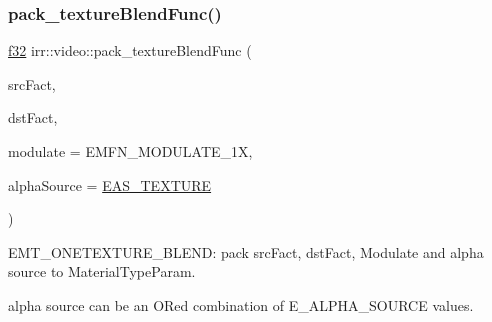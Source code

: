 \subsubsection{\texorpdfstring{pack\+\_\+texture\+Blend\+Func()}{pack\_textureBlendFunc()}}
{\footnotesize\ttfamily \hyperlink{namespaceirr_a0277be98d67dc26ff93b1a6a1d086b07}{f32} irr\+::video\+::pack\+\_\+texture\+Blend\+Func (\begin{DoxyParamCaption}\item[{const \hyperlink{namespaceirr_1_1video_acae10401850a6cfd5fcf1548c6c884bc}{E\+\_\+\+B\+L\+E\+N\+D\+\_\+\+F\+A\+C\+T\+OR}}]{src\+Fact,  }\item[{const \hyperlink{namespaceirr_1_1video_acae10401850a6cfd5fcf1548c6c884bc}{E\+\_\+\+B\+L\+E\+N\+D\+\_\+\+F\+A\+C\+T\+OR}}]{dst\+Fact,  }\item[{const \hyperlink{namespaceirr_1_1video_a1402e9045137ae232fafbdf385800843}{E\+\_\+\+M\+O\+D\+U\+L\+A\+T\+E\+\_\+\+F\+U\+NC}}]{modulate = {\ttfamily EMFN\+\_\+MODULATE\+\_\+1X},  }\item[{const \hyperlink{namespaceirr_a0416a53257075833e7002efd0a18e804}{u32}}]{alpha\+Source = {\ttfamily \hyperlink{namespaceirr_1_1video_a08b237bb445ffc0f32932c8ed87c6e63ad57d5d09230cefbfc77681b6ec2c92fe}{E\+A\+S\+\_\+\+T\+E\+X\+T\+U\+RE}} }\end{DoxyParamCaption})\hspace{0.3cm}{\ttfamily [inline]}}



E\+M\+T\+\_\+\+O\+N\+E\+T\+E\+X\+T\+U\+R\+E\+\_\+\+B\+L\+E\+ND\+: pack src\+Fact, dst\+Fact, Modulate and alpha source to Material\+Type\+Param. 

alpha source can be an OR\textquotesingle{}ed combination of E\+\_\+\+A\+L\+P\+H\+A\+\_\+\+S\+O\+U\+R\+CE values. \mbox{\label{namespaceirr_1_1video_a6d0644626c746278881ceae7e33e75c0}} 

